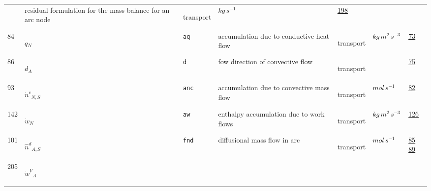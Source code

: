 \begin{longtable}{|p{1cm}|p{2.5cm}|p{4.5cm}|p{8cm}|p{3.0cm}|p{3cm}|p{1cm}|}
             & residual formulation for the mass balance for an arc node
             & \begin{lay}transport \end{lay}
             & $ kg \,s^{-1} \, $
             &                 \hyperlink{"e:198"}{ 198 }
                 \\
            84
             & \hypertarget{"v:84"}{ $ {{\dot{q}}}{_{N}} $}
             & \verb|aq|
             & accumulation due to conductive heat flow
             & \begin{lay}transport \end{lay}
             & $ kg \,m^{2} \,s^{-3} \, $
             &                 \hyperlink{"e:73"}{ 73 }
                 \\
            86
             & \hypertarget{"v:86"}{ $ {d}{_{A}} $}
             & \verb|d|
             & fow direction of convective flow
             & \begin{lay}transport \end{lay}
             & $  $
             &                 \hyperlink{"e:75"}{ 75 }
                 \\
            93
             & \hypertarget{"v:93"}{ $ {{\dot{n}^c}}{_{N, S}} $}
             & \verb|anc|
             & accumulation due to convective mass flow
             & \begin{lay}transport \end{lay}
             & $ mol \,s^{-1} \, $
             &                 \hyperlink{"e:82"}{ 82 }
                 \\
            142
             & \hypertarget{"v:142"}{ $ {{\dot{w}}}{_{N}} $}
             & \verb|aw|
             & enthalpy accumulation due to work flows
             & \begin{lay}transport \end{lay}
             & $ kg \,m^{2} \,s^{-3} \, $
             &                 \hyperlink{"e:126"}{ 126 }
                 \\
            101
             & \hypertarget{"v:101"}{ $ {{\hat{n}^d}}{_{A, S}} $}
             & \verb|fnd|
             & diffusional mass flow in arc
             & \begin{lay}transport \end{lay}
             & $ mol \,s^{-1} \, $
             &                 \hyperlink{"e:85"}{ 85 }
                                 \hyperlink{"e:89"}{ 89 }
                 \\
            205
             & \hypertarget{"v:205"}{ $ {{\dot{w}^V}}{_{A}} $}

\end{longtable}
